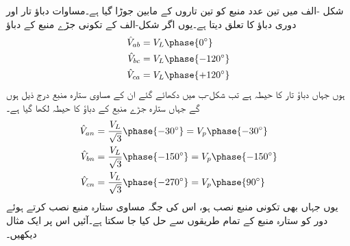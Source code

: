شکل -الف میں تین عدد منبع کو تین تاروں کے مابین   جوڑا گیا ہے۔مساوات  دباؤ تار اور دوری دباؤ کا تعلق دیتا ہے۔یوں اگر شکل-الف کے تکونی جڑے منبع کے دباؤ
\begin{gather}
\begin{aligned}
\hat{V}_{ab}&=V_L\phase{0^{\circ}}\\
\hat{V}_{bc}&=V_L\phase{-120^{\circ}}\\
\hat{V}_{ca}&=V_L\phase{+120^{\circ}}
\end{aligned}
\end{gather}
ہوں جہاں  دباؤ تار کا حیطہ  ہے تب شکل-ب میں دکھائے گئے ان کے مساوی ستارہ منبع درج ذیل ہوں گے جہاں ستارہ جڑے منبع کے دباؤ کا حیطہ  لکھا گیا ہے۔
 \begin{gather}
\begin{aligned}
\hat{V}_{an}&=\frac{V_L}{\sqrt{3}}\phase{-30^{\circ}}=V_p\phase{-30^{\circ}}\\
\hat{V}_{bn}&=\frac{V_L}{\sqrt{3}}\phase{-150^{\circ}}=V_p\phase{-150^{\circ}}\\
\hat{V}_{cn}&=\frac{V_L}{\sqrt{3}}\phase{-270^{\circ}}=V_p\phase{90^{\circ}}
\end{aligned}
\end{gather}
یوں جہاں بھی تکونی منبع نصب ہو، اس کی جگہ مساوی ستارہ منبع نصب کرتے ہوئے دور کو ستارہ منبع کے تمام طریقوں سے حل کیا جا سکتا ہے۔آئیں اس پر ایک مثال دیکھیں۔ 
